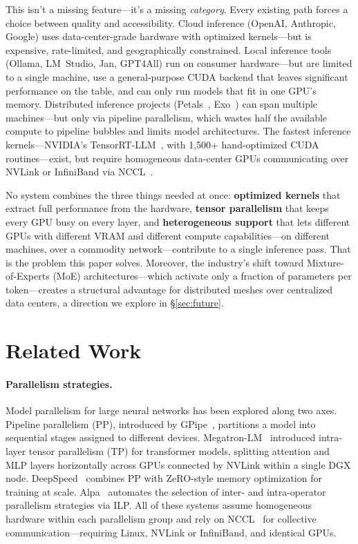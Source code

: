\documentclass[10pt,twocolumn]{article}
\begin{document}
This isn't a missing feature---it's a missing \emph{category}.
Every existing path forces a choice between quality and accessibility.
Cloud inference (OpenAI, Anthropic, Google) uses data-center-grade hardware
with optimized kernels---but is expensive, rate-limited, and geographically
constrained.  Local inference tools (Ollama, LM~Studio, Jan, GPT4All) run
on consumer hardware---but are limited to a single machine, use a
general-purpose CUDA backend that leaves significant performance on the
table, and can only run models that fit in one GPU's memory.  Distributed
inference projects (Petals~\citep{borzunov2023petals},
Exo~\citep{exo2024}) can span multiple machines---but only via pipeline
parallelism, which wastes half the available compute to pipeline bubbles
and limits model architectures.  The fastest inference
kernels---NVIDIA's TensorRT-LLM~\citep{nvidia2024trtllm}, with 1,500+
hand-optimized CUDA routines---exist, but require homogeneous data-center
GPUs communicating over NVLink or InfiniBand via
NCCL~\citep{nvidia2024nccl}.

No system combines the three things needed at once: \textbf{optimized
kernels} that extract full performance from the hardware, \textbf{tensor
parallelism} that keeps every GPU busy on every layer, and
\textbf{heterogeneous support} that lets different GPUs with different VRAM
and different compute capabilities---on different machines, over a
commodity network---contribute to a single inference pass.
That is the problem this paper solves.
Moreover, the industry's shift toward Mixture-of-Experts (MoE)
architectures---which activate only a fraction of parameters per
token---creates a structural advantage for distributed meshes over
centralized data centers, a direction we explore in
\S\ref{sec:future}.

\section{Related Work}\label{sec:related}

\paragraph{Parallelism strategies.}
Model parallelism for large neural networks has been explored along two
axes.  Pipeline parallelism (PP), introduced by
GPipe~\citep{huang2019gpipe}, partitions a model into sequential stages
assigned to different devices.  Megatron-LM~\citep{shoeybi2019megatron}
introduced intra-layer tensor parallelism (TP) for transformer models,
splitting attention and MLP layers horizontally across GPUs connected by
NVLink within a single DGX node.  DeepSpeed~\citep{rasley2020deepspeed}
combines PP with ZeRO-style memory optimization for training at scale.
Alpa~\citep{zheng2022alpa} automates the selection of inter- and
intra-operator parallelism strategies via ILP\@.  All of these systems
assume homogeneous hardware within each parallelism group and rely on
NCCL~\citep{nvidia2024nccl} for collective communication---requiring
Linux, NVLink or InfiniBand, and identical GPUs.
\end{document}
